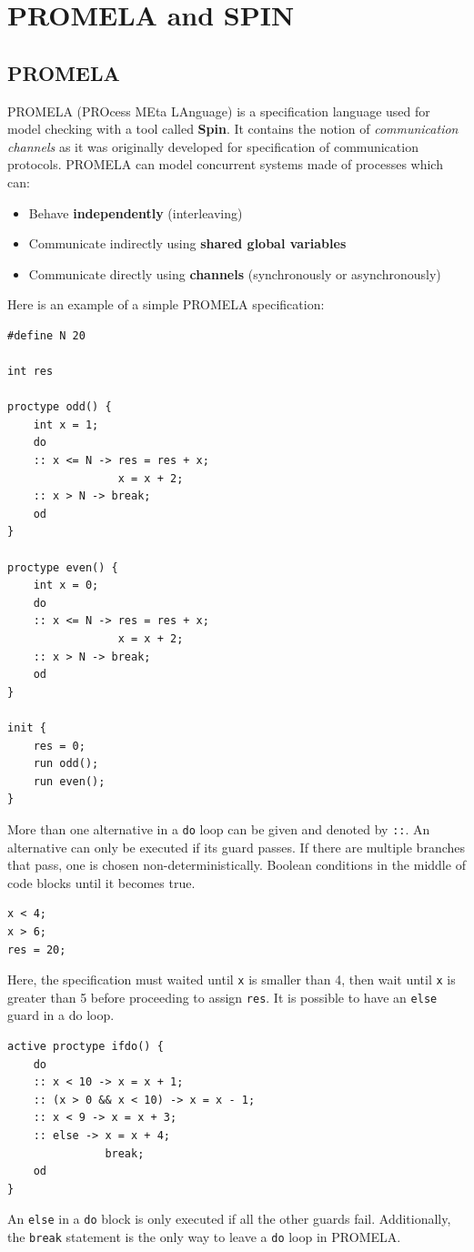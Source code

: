 \documentclass[11pt]{article}
\begin{document}
\section{PROMELA and SPIN}
\subsection{PROMELA}
PROMELA (PROcess MEta LAnguage) is a specification language used for model checking with a tool called \textbf{Spin}. It contains the notion of \textit{communication channels} as it was originally developed for specification of communication protocols. 
\n
PROMELA can model concurrent systems made of processes which can:
\begin{itemize}
\item Behave \textbf{independently} (interleaving)
\item Communicate indirectly using \textbf{shared global variables}
\item Communicate directly using \textbf{channels} (synchronously or asynchronously)
\end{itemize}
Here is an example of a simple PROMELA specification:
\\
\begin{lstlisting}[caption={Simple PROMELA specification}, captionpos=b]
#define N 20

int res

proctype odd() {
	int x = 1;
	do
	:: x <= N -> res = res + x;
				 x = x + 2;
	:: x > N -> break;
	od
}

proctype even() {
	int x = 0;
	do
	:: x <= N -> res = res + x;
				 x = x + 2;
	:: x > N -> break;
	od
}

init {
	res = 0;
	run odd();
	run even();
}
\end{lstlisting}
\noindent
More than one alternative in a \texttt{do} loop can be given and denoted by \texttt{::}. An alternative can only be executed if its guard passes. If there are multiple branches that pass, one is chosen non-deterministically. 
\n
Boolean conditions in the middle of code blocks until it becomes true. 
\begin{lstlisting}[caption={Boolean conditions in PROMELA}, captionpos=b]
x < 4;
x > 6;
res = 20;
\end{lstlisting}
\noindent
Here, the specification must waited until \texttt{x} is smaller than 4, then wait until \texttt{x} is greater than 5 before proceeding to assign \texttt{res}.
\n
It is possible to have an \texttt{else} guard in a do loop.
\begin{lstlisting}[caption={PROMELA Do loops in detail}, captionpos=b]
active proctype ifdo() {
	do
	:: x < 10 -> x = x + 1;
	:: (x > 0 && x < 10) -> x = x - 1;
	:: x < 9 -> x = x + 3;
	:: else -> x = x + 4;
			   break;
	od
}
\end{lstlisting}
\noindent
An \texttt{else} in a \texttt{do} block is only executed if all the other guards fail. Additionally, the \texttt{break} statement is the only way to leave a \texttt{do} loop in PROMELA.
\end{document}
